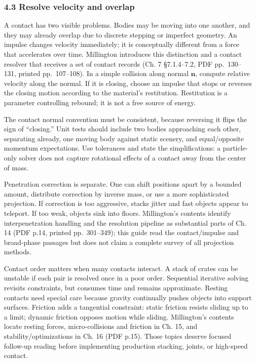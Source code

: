 \subsubsection{4.3 Resolve velocity and overlap}\label{06-engine-ii-ch033-resolve-velocity-and-overlap}

A contact has two visible problems. Bodies may be moving into one another, and they may already overlap due to discrete stepping or imperfect geometry. An impulse changes velocity immediately; it is conceptually different from a force that accelerates over time. Millington introduces this distinction and a contact resolver that receives a set of contact records (Ch. 7 §7.1.4--7.2, PDF pp.~130--131, printed pp.~107--108). In a simple collision along normal \(\mathbf{n}\), compute relative velocity along the normal. If it is closing, choose an impulse that stops or reverses the closing motion according to the material's restitution. Restitution is a parameter controlling rebound; it is not a free source of energy.

The contact normal convention must be consistent, because reversing it flips the sign of ``closing.'' Unit tests should include two bodies approaching each other, separating already, one moving body against static scenery, and equal/opposite momentum expectations. Use tolerances and state the simplifications: a particle-only solver does not capture rotational effects of a contact away from the center of mass.

Penetration correction is separate. One can shift positions apart by a bounded amount, distribute correction by inverse mass, or use a more sophisticated projection. If correction is too aggressive, stacks jitter and fast objects appear to teleport. If too weak, objects sink into floors. Millington's contents identify interpenetration handling and the resolution pipeline as substantial parts of Ch. 14 (PDF p.14, printed pp.~301--349); this guide read the contact/impulse and broad-phase passages but does not claim a complete survey of all projection methods.

Contact order matters when many contacts interact. A stack of crates can be unstable if each pair is resolved once in a poor order. Sequential iterative solving revisits constraints, but consumes time and remains approximate. Resting contacts need special care because gravity continually pushes objects into support surfaces. Friction adds a tangential constraint: static friction resists sliding up to a limit; dynamic friction opposes motion while sliding. Millington's contents locate resting forces, micro-collisions and friction in Ch. 15, and stability/optimizations in Ch. 16 (PDF p.15). Those topics deserve focused follow-up reading before implementing production stacking, joints, or high-speed contact.


